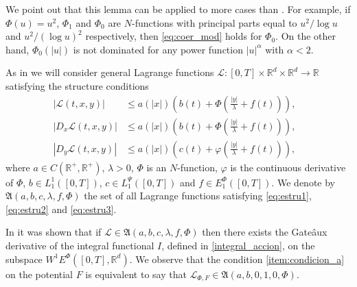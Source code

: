 \documentclass[twoside]{article}
\theoremstyle{remark}
\newcommand{\lpsi}{L^{\Psi}}
\newcommand{\ephi}{E^{\Phi}}
\newcommand{\wphie}{W^{1}\ephi}
\newcommand{\rr}{\mathbb{R}}
\renewcommand{\leq}{\leqslant}
\newcounter{example}
\begin{document}
 We point out that this lemma can be applied to more cases than \cite[Lemma 5.2]{ABGMS2015}. For example, if $\Phi(u)=u^2$, $\Phi_1$ and $\Phi_0$ are  $N$-functions with principal parts equal to $u^2/\log u$ and $u^2/(\log u)^2$ respectively, then  \eqref{eq:coer_mod} holds for $\Phi_0$. On the other hand, $\Phi_0(|u|)$ is not dominated for any  power function $|u|^{\alpha}$ with $\alpha<2$.




As in  \cite{ABGMS2015} we will consider general Lagrange functions
$\mathcal{L}:[0,T]\times\rr^d\times\rr^d\to\rr$
satisfying the structure conditions
\begin{align}
|\mathcal{L}(t,x,y)| &\leq a(|x|)\left(b(t)+ \Phi\left(\frac{|y|}{\lambda}+f(t) \right)\right),&\tag{$A_1$}\label{eq:estru1}
\\
|D_{x}\mathcal{L}(t,x,y)| &\leq a(|x|)\left(b(t)+ \Phi\left(\frac{|y|}{\lambda}+f(t) \right)\right),&\tag{$A_2$}\label{eq:estru2}
\\
|D_{y}\mathcal{L}(t,x,y)| &\leq a(|x|)\left(c(t)+ \varphi\left(\frac{|y|}{\lambda}+f(t)\right)\right),
&\tag{$A_3$}\label{eq:estru3}
\end{align}
where $a\in C(\mathbb{R}^+,\mathbb{R}^+)$, $\lambda>0$, $\Phi$ is an $N$-function,
$\varphi$ is the continuous derivative of $\Phi$,
$b\in L^1_1([0,T])$,  $c\in\lpsi_1([0,T])$ and  $f\in \ephi_1([0,T])$. We denote by $\mathfrak{A}(a,b,c,\lambda,f,\Phi)$ the set of all Lagrange functions satisfying  \eqref{eq:estru1}, \eqref{eq:estru2} and \eqref{eq:estru3}.




In
\cite{ABGMS2015} it was shown that if $\mathcal{L}\in \mathfrak{A}(a,b,c,\lambda,f,\Phi)$ 
then there  exists the Gate\^aux derivative of the integral functional $I$, defined in \eqref{integral_accion}, 
on the subspace $\wphie([0,T],\rr^d)$. We observe that the condition \ref{item:condicion_a} on the potential $F$ is equivalent to say that $\mathcal{L}_{\Phi,F}\in \mathfrak{A}(a,b,0,1,0,\Phi)$.
\end{document}
